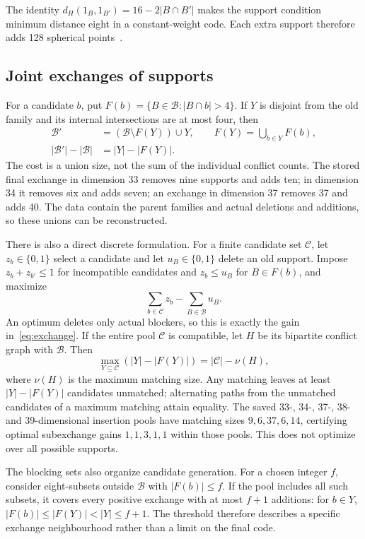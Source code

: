 The identity $d_H(1_B,1_{B'})=16-2|B\cap B'|$ makes the support condition
minimum distance eight in a constant-weight code. Each extra support
therefore adds 128 spherical points~\cite{bsss,brouwer,echols}.

\subsection{Joint exchanges of supports}

For a candidate $b$, put $F(b)=\{B\in\mathcal B:|B\cap b|>4\}$.
If $Y$ is disjoint from the old family and its internal intersections are
at most four, then
\begin{equation}
\begin{split}
\mathcal B'&=(\mathcal B\setminus F(Y))\cup Y,\qquad
 F(Y)=\bigcup_{b\in Y}F(b),\\
|\mathcal B'|-|\mathcal B|&=|Y|-|F(Y)|.
\end{split}
\label{eq:exchange}
\end{equation}
The cost is a union size, not the sum of the individual conflict counts.
The stored final exchange in dimension 33 removes nine supports and adds
ten; in dimension 34 it removes six and adds seven; an exchange in dimension
37 removes 37 and adds 40. The data contain
the parent families and actual deletions and additions, so these unions
can be reconstructed.

There is also a direct discrete formulation. For a finite candidate set
$\mathcal C$, let $z_b\in\{0,1\}$ select a candidate and let
$u_B\in\{0,1\}$ delete an old support. Impose $z_b+z_{b'}\le1$
for incompatible candidates and $z_b\le u_B$ for $B\in F(b)$, and maximize
\[
\sum_{b\in\mathcal C}z_b-\sum_{B\in\mathcal B}u_B.
\]
An optimum deletes only actual blockers, so this is exactly the gain
in~\eqref{eq:exchange}. If the entire pool $\mathcal C$ is compatible,
let $H$ be its bipartite conflict graph with $\mathcal B$. Then
\[
\max_{Y\subseteq\mathcal C}(|Y|-|F(Y)|)=|\mathcal C|-\nu(H),
\]
where $\nu(H)$ is the maximum matching size. Any matching leaves at
least $|Y|-|F(Y)|$ candidates unmatched; alternating paths from the
unmatched candidates of a maximum matching attain equality. The saved
33-, 34-, 37-, 38- and 39-dimensional insertion pools have matching
sizes $9,6,37,6,14$, certifying optimal subexchange gains $1,1,3,1,1$
within those pools. This does not optimize over all possible supports.

The blocking sets also organize candidate generation. For a chosen integer
$f$, consider eight-subsets outside $\mathcal B$ with $|F(b)|\le f$.
If the pool includes all such subsets, it covers every positive exchange
with at most $f+1$ additions: for $b\in Y$,
$|F(b)|\le|F(Y)|<|Y|\le f+1$. The threshold therefore describes a
specific exchange neighbourhood rather than a limit on the final code.

